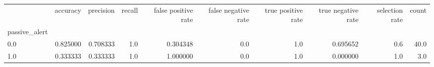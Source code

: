 \begin{tabular}{lrrrrrrrrr}
\toprule
{} &  accuracy &  precision &  recall &  false positive rate &  false negative rate &  true positive rate &  true negative rate &  selection rate &  count \\
passive\_alert &           &            &         &                      &                      &                     &                     &                 &        \\
\midrule
0.0           &  0.825000 &   0.708333 &     1.0 &             0.304348 &                  0.0 &                 1.0 &            0.695652 &             0.6 &   40.0 \\
1.0           &  0.333333 &   0.333333 &     1.0 &             1.000000 &                  0.0 &                 1.0 &            0.000000 &             1.0 &    3.0 \\
\bottomrule
\end{tabular}
